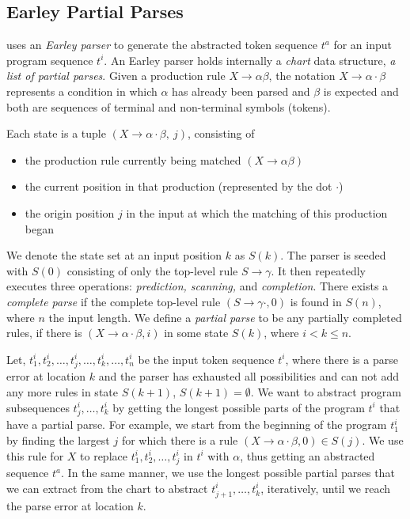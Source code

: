 \subsection{Earley Partial Parses}
\label{sec:prog-abstract:partial}

\toolname uses an \emph{Earley parser} to generate the abstracted token
sequence $t^a$ for an input program sequence $t^i$. An Earley parser holds
internally a \emph{chart} data structure, \ie \emph{a list of partial parses}.
Given a production rule $X \rightarrow \alpha \beta$, the notation $X
\rightarrow \alpha \cdot \beta$ represents a condition in which $\alpha$ has
already been parsed and $\beta$ is expected and both are sequences of terminal
and non-terminal symbols (tokens).

Each state is a tuple $(X \rightarrow \alpha \cdot \beta,\ j)$, consisting of
\begin{itemize}
    \item the production rule currently being matched $(X \rightarrow \alpha
    \beta)$
    \item the current position in that production (represented by the dot
    $\cdot$)
    \item the origin position $j$ in the input at which the matching of this
    production began
\end{itemize}

We denote the state set at an input position $k$ as $S(k)$. The parser is seeded
with $S(0)$ consisting of only the top-level rule $S \rightarrow \gamma$. It
then repeatedly executes three operations: \emph{prediction, scanning,} and
\emph{completion}. There exists a \emph{complete parse} if the complete
top-level rule $(S \rightarrow \gamma \cdot, 0)$ is found in $S(n)$, where $n$
the input length. We define a \emph{partial parse} to be any partially completed
rules, \ie if there is $(X \rightarrow \alpha \cdot \beta, i)$ in some state
$S(k)$, where $i < k \leq n$.

Let, $t^i_1, t^i_2, \dots, t^i_j, \dots, t^i_k, \dots, t^i_n$ be the
input token sequence $t^i$, where there is a parse error at location $k$ and the
parser has exhausted all possibilities and can not add any more rules in state
$S(k + 1)$, \ie $S(k + 1) = \emptyset$. We want to abstract program subsequences
$t^i_j, \dots, t^i_k$ by getting the longest possible parts of the program $t^i$
that have a partial parse. For example, we start from the beginning of the
program $t^i_1$ by finding the largest $j$ for which there is a rule $(X
\rightarrow \alpha \cdot \beta, 0) \in S(j)$. We use this rule for $X$ to
replace $t^i_1, t^i_2, \dots, t^i_j$ in $t^i$ with $\alpha$, thus getting an
abstracted sequence $t^a$. In the same manner, we use the longest possible
partial parses that we can extract from the chart to abstract $t^i_{j+1}, \dots,
t^i_k$, iteratively, until we reach the parse error at location $k$.

